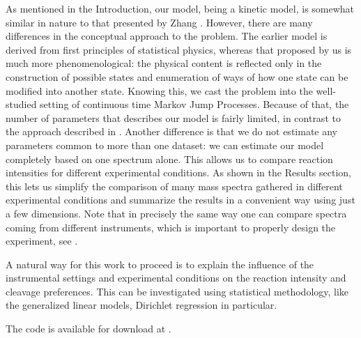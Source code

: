\documentclass{llncs}
\begin{document}
As mentioned in the Introduction, our model, being a kinetic model, is somewhat similar in nature to that presented by Zhang \cite{Zhang2010-fp}. However, there are many differences in the conceptual approach to the problem. The earlier model is derived from first principles of statistical physics, whereas that proposed by us is much more phenomenological: the physical content is reflected only in the construction of possible states and enumeration of ways of how one state can be modified into another state. Knowing this, we cast the problem into the well-studied setting of continuous time Markov Jump Processes. Because of that, the number of parameters that describes our model is fairly limited, in contrast to the approach described in  \cite{Zhang2010-fp}. Another difference is that we do not estimate any parameters common to more than one dataset: we can estimate our model completely based on one spectrum alone. This allows us to compare reaction intensities for different experimental conditions. As shown in the Results section, this lets us simplify the comparison of many mass spectra gathered in different experimental conditions and summarize the results in a convenient way using just a few dimensions. Note that in precisely the same way one can compare spectra coming from different instruments, which is important to properly design the experiment, see \cite{Lermyte2015-lm}.

A natural way for this work to proceed is to explain the influence of the instrumental settings and experimental conditions on the reaction intensity and cleavage preferences. This can be investigated using statistical methodology, like the generalized linear models, Dirichlet regression in particular.

The code is available for download at \url{}.

\end{document}
